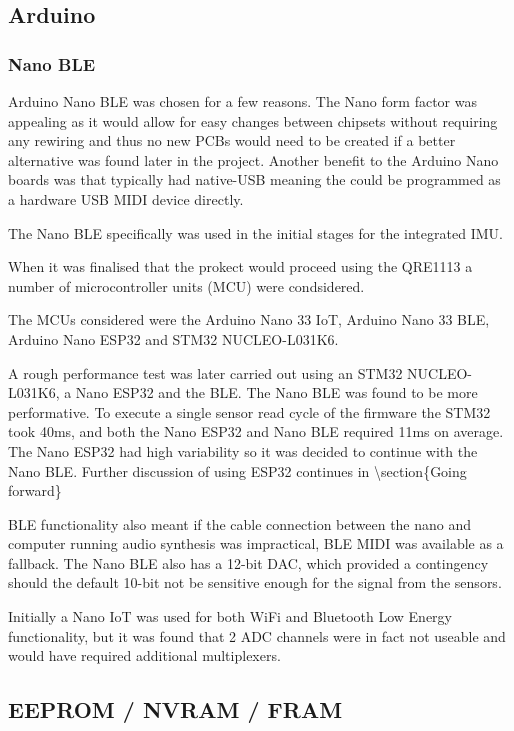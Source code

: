 \subsection{Arduino}\label{arduino}

\subsubsection{Nano BLE}\label{nano-ble}

Arduino Nano BLE was chosen for a few reasons. The Nano form factor was
appealing as it would allow for easy changes between chipsets without
requiring any rewiring and thus no new PCBs would need to be created if
a better alternative was found later in the project. Another benefit to
the Arduino Nano boards was that typically had native-USB meaning the
could be programmed as a hardware USB MIDI device directly.

The Nano BLE specifically was used in the initial stages for the
integrated IMU.

When it was finalised that the prokect would proceed using the QRE1113 a
number of microcontroller units (MCU) were condsidered.

The MCUs considered were the Arduino Nano 33 IoT, Arduino Nano 33 BLE,
Arduino Nano ESP32 and STM32 NUCLEO-L031K6.

A rough performance test was later carried out using an STM32
NUCLEO-L031K6, a Nano ESP32 and the BLE. The Nano BLE was found to be
more performative. To execute a single sensor read cycle of the firmware
the STM32 took 40ms, and both the Nano ESP32 and Nano BLE required 11ms
on average. The Nano ESP32 had high variability so it was decided to
continue with the Nano BLE. Further discussion of using ESP32 continues
in \textbackslash section\{Going forward\}

BLE functionality also meant if the cable connection between the nano
and computer running audio synthesis was impractical, BLE MIDI was
available as a fallback. The Nano BLE also has a 12-bit DAC, which
provided a contingency should the default 10-bit not be sensitive enough
for the signal from the sensors.

Initially a Nano IoT was used for both WiFi and Bluetooth Low Energy
functionality, but it was found that 2 ADC channels were in fact not
useable and would have required additional multiplexers.

\subsection{EEPROM / NVRAM / FRAM}\label{eeprom-nvram-fram}

